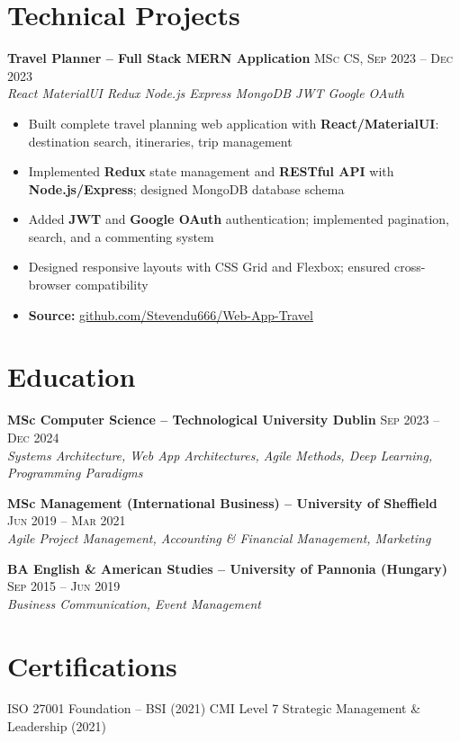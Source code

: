 \documentclass{simpleresume}
\begin{document}
\section{Technical Projects}
\noindent\textbf{Travel Planner -- Full Stack MERN Application}
  \hfill{\sffamily\scshape\small\color{muted}MSc CS, Sep 2023 -- Dec 2023}\\
  {\itshape\color{accent}\footnotesize React \quad\textbullet\quad MaterialUI \quad\textbullet\quad Redux \quad\textbullet\quad Node.js \quad\textbullet\quad Express \quad\textbullet\quad MongoDB \quad\textbullet\quad JWT \quad\textbullet\quad Google OAuth}
\vspace{-0.25mm}
\begin{itemize}
  \item Built complete travel planning web application with \textbf{React/MaterialUI}: destination search, itineraries, trip management
  \item Implemented \textbf{Redux} state management and \textbf{RESTful API} with \textbf{Node.js/Express}; designed MongoDB database schema
  \item Added \textbf{JWT} and \textbf{Google OAuth} authentication; implemented pagination, search, and a commenting system
  \item Designed responsive layouts with CSS Grid and Flexbox; ensured cross-browser compatibility
  \item \textbf{Source:} \href{https://github.com/Stevendu666/Web-App-Travel}{github.com/Stevendu666/Web-App-Travel}
\end{itemize}

\section{Education}
\noindent\textbf{MSc Computer Science -- Technological University Dublin}
  \hfill{\sffamily\scshape\small\color{muted}Sep 2023 -- Dec 2024}\\
  {\itshape\color{secondary}Systems Architecture, Web App Architectures, Agile Methods, Deep Learning, Programming Paradigms}

\vspace{0.08cm}
\noindent\textbf{MSc Management (International Business) -- University of Sheffield}
  \hfill{\sffamily\scshape\small\color{muted}Jun 2019 -- Mar 2021}\\
  {\itshape\color{secondary}Agile Project Management, Accounting \& Financial Management, Marketing}

\vspace{0.08cm}
\noindent\textbf{BA English \& American Studies -- University of Pannonia (Hungary)}
  \hfill{\sffamily\scshape\small\color{muted}Sep 2015 -- Jun 2019}\\
  {\itshape\color{secondary}Business Communication, Event Management}

\section{Certifications}
\noindent
{\sffamily\small\color{secondary}
  ISO 27001 Foundation -- BSI (2021) \quad\textbullet\quad
  CMI Level 7 Strategic Management \& Leadership (2021)
}
\end{document}
